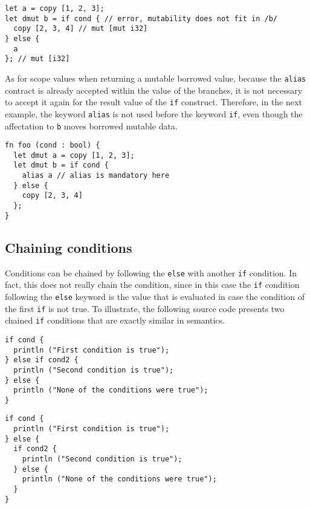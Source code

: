 \begin{lstlisting}[style=coloredverbatim]
let a = copy [1, 2, 3];
let dmut b = if cond { // error, mutability does not fit in /b/
  copy [2, 3, 4] // mut [mut i32]
} else {
  a
}; // mut [i32]
\end{lstlisting}

As for scope values when returning a mutable borrowed value, because
the \texttt{alias} contract is already accepted within the value of the
branches, it is not necessary to accept it again for the result value of the
\texttt{if} construct. Therefore, in the next example, the keyword
\texttt{alias} is not used before the keyword \texttt{if}, even though the
affectation to \texttt{b} moves borrowed mutable data.

\begin{lstlisting}[style=coloredverbatim]
fn foo (cond : bool) {
  let dmut a = copy [1, 2, 3];
  let dmut b = if cond {
    alias a // alias is mandatory here
  } else {
    copy [2, 3, 4]
  };
}
\end{lstlisting}


\subsection{Chaining conditions}

Conditions can be chained by following the \texttt{else} with another
\texttt{if} condition. In fact, this does not really chain the condition, since
in this case the \texttt{if} condition following the \texttt{else} keyword is
the value that is evaluated in case the condition of the first \texttt{if} is
not true. To illustrate, the following source code presents two chained
\texttt{if} conditions that are exactly similar in semantics.


\begin{minipage}[t][][t]{0.47\linewidth}
\begin{lstlisting}[style=coloredverbatim, caption=Using a \texttt{if} as the value of the \texttt{else} branch]
if cond {
  println ("First condition is true");
} else if cond2 {
  println ("Second condition is true");
} else {
  println ("None of the conditions were true");
}
\end{lstlisting}
\end{minipage}\hspace{10pt}%
\begin{minipage}[t][][t]{0.47\linewidth}
  \begin{lstlisting}[style=coloredverbatim, caption=Using a block as the value of the \texttt{else} branch]
if cond {
  println ("First condition is true");
} else {
  if cond2 {
    println ("Second condition is true");
  } else {
    println ("None of the conditions were true");
  }
}
  \end{lstlisting}
\end{minipage}
\vspace{-10pt}%

